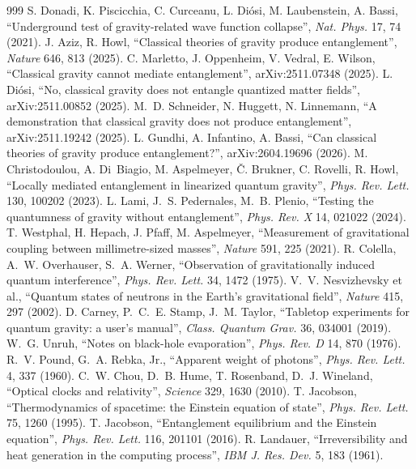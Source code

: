 \documentclass[11pt,a4paper]{article}
\theoremstyle{definition}
\theoremstyle{remark}
\theoremstyle{definition}
\begin{document}
\begin{thebibliography}{999}
 S. Donadi, K. Piscicchia, C. Curceanu, L. Di\'osi, M. Laubenstein, A. Bassi, ``Underground test of gravity-related wave
function collapse'', \emph{Nat. Phys.} 17, 74 (2021).
 J. Aziz, R. Howl, ``Classical theories of gravity produce entanglement'', \emph{Nature} 646, 813 (2025).
 C. Marletto, J. Oppenheim, V. Vedral, E. Wilson, ``Classical gravity cannot mediate entanglement'', arXiv:2511.07348
(2025).
 L. Di\'osi, ``No, classical gravity does not entangle quantized matter fields'', arXiv:2511.00852 (2025).
 M.~D. Schneider, N. Huggett, N. Linnemann, ``A demonstration that classical gravity does not produce entanglement'',
arXiv:2511.19242 (2025).
 L. Gundhi, A. Infantino, A. Bassi, ``Can classical theories of gravity produce entanglement?'', arXiv:2604.19696 (2026).
 M. Christodoulou, A. Di~Biagio, M. Aspelmeyer, \v{C}. Brukner, C. Rovelli, R. Howl, ``Locally mediated
entanglement in linearized quantum gravity'', \emph{Phys. Rev. Lett.} 130, 100202 (2023).
 L. Lami, J.~S. Pedernales, M.~B. Plenio, ``Testing the quantumness of gravity without entanglement'', \emph{Phys. Rev. X} 14,
021022 (2024).
 T. Westphal, H. Hepach, J. Pfaff, M. Aspelmeyer, ``Measurement of gravitational coupling between millimetre-sized
masses'', \emph{Nature} 591, 225 (2021).
 R. Colella, A.~W. Overhauser, S.~A. Werner, ``Observation of gravitationally induced quantum interference'', \emph{Phys. Rev.
Lett.} 34, 1472 (1975).
 V.~V. Nesvizhevsky et al., ``Quantum states of neutrons in the Earth's gravitational field'', \emph{Nature} 415,
297 (2002).
 D. Carney, P.~C.~E. Stamp, J.~M. Taylor, ``Tabletop experiments for quantum gravity: a user's manual'', \emph{Class. Quantum
Grav.} 36, 034001 (2019).
 W.~G. Unruh, ``Notes on black-hole evaporation'', \emph{Phys. Rev. D} 14, 870 (1976).
 R.~V. Pound, G.~A. Rebka, Jr., ``Apparent weight of photons'', \emph{Phys. Rev. Lett.} 4, 337 (1960).
 C.~W. Chou, D.~B. Hume, T. Rosenband, D.~J. Wineland, ``Optical clocks and relativity'', \emph{Science} 329, 1630 (2010).
 T. Jacobson, ``Thermodynamics of spacetime: the Einstein equation of state'', \emph{Phys. Rev. Lett.} 75, 1260 (1995).
 T. Jacobson, ``Entanglement equilibrium and the Einstein equation'', \emph{Phys. Rev. Lett.} 116, 201101 (2016).
 R. Landauer, ``Irreversibility and heat generation in the computing process'', \emph{IBM J. Res. Dev.} 5, 183 (1961).

\end{thebibliography}
\end{document}
